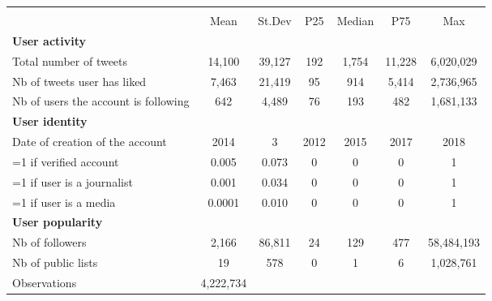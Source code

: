 {
\def\sym#1{\ifmmode^{#1}\else\(^{#1}\)\fi}
\begin{tabular}{l*{1}{cccccc}}
\hline\hline
                    &\multicolumn{6}{c}{}                                                         \\
                    &        Mean&      St.Dev&         P25&      Median&         P75&         Max\\
\hline
\textbf{User activity}&            &            &            &            &            &            \\
Total number of tweets&      14,100&      39,127&         192&       1,754&      11,228&   6,020,029\\
Nb of tweets user has liked&       7,463&      21,419&          95&         914&       5,414&   2,736,965\\
Nb of users the account is following&         642&       4,489&          76&         193&         482&   1,681,133\\
\textbf{User identity}&            &            &            &            &            &            \\
Date of creation of the account&        2014&           3&        2012&        2015&        2017&        2018\\
=1 if verified account&       0.005&       0.073&           0&           0&           0&           1\\
=1 if user is a journalist&       0.001&       0.034&           0&           0&           0&           1\\
=1 if user is a media&      0.0001&       0.010&           0&           0&           0&           1\\
\textbf{User popularity}&            &            &            &            &            &            \\
Nb of followers     &       2,166&      86,811&          24&         129&         477&  58,484,193\\
Nb of public lists  &          19&         578&           0&           1&           6&   1,028,761\\
\hline
Observations        &   4,222,734&            &            &            &            &            \\
\hline\hline
\end{tabular}
}
